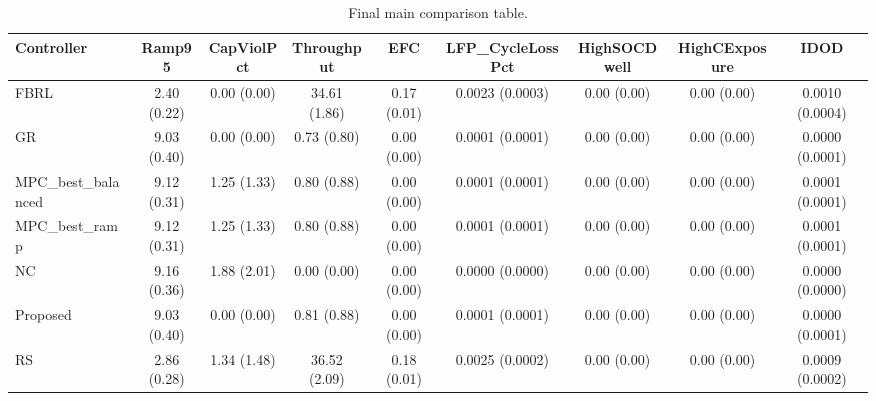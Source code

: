 \begin{table}[t]
\centering
\caption{Final main comparison table.}
\label{tab:results_final_auto}
\begin{tabular}{lcccccccc}
\toprule
Controller & Ramp95 & CapViolPct & Throughput & EFC & LFP\_CycleLossPct & HighSOCDwell & HighCExposure & IDOD \\
\midrule
FBRL & 2.40 (0.22) & 0.00 (0.00) & 34.61 (1.86) & 0.17 (0.01) & 0.0023 (0.0003) & 0.00 (0.00) & 0.00 (0.00) & 0.0010 (0.0004) \\
GR & 9.03 (0.40) & 0.00 (0.00) & 0.73 (0.80) & 0.00 (0.00) & 0.0001 (0.0001) & 0.00 (0.00) & 0.00 (0.00) & 0.0000 (0.0001) \\
MPC\_best\_balanced & 9.12 (0.31) & 1.25 (1.33) & 0.80 (0.88) & 0.00 (0.00) & 0.0001 (0.0001) & 0.00 (0.00) & 0.00 (0.00) & 0.0001 (0.0001) \\
MPC\_best\_ramp & 9.12 (0.31) & 1.25 (1.33) & 0.80 (0.88) & 0.00 (0.00) & 0.0001 (0.0001) & 0.00 (0.00) & 0.00 (0.00) & 0.0001 (0.0001) \\
NC & 9.16 (0.36) & 1.88 (2.01) & 0.00 (0.00) & 0.00 (0.00) & 0.0000 (0.0000) & 0.00 (0.00) & 0.00 (0.00) & 0.0000 (0.0000) \\
Proposed & 9.03 (0.40) & 0.00 (0.00) & 0.81 (0.88) & 0.00 (0.00) & 0.0001 (0.0001) & 0.00 (0.00) & 0.00 (0.00) & 0.0000 (0.0001) \\
RS & 2.86 (0.28) & 1.34 (1.48) & 36.52 (2.09) & 0.18 (0.01) & 0.0025 (0.0002) & 0.00 (0.00) & 0.00 (0.00) & 0.0009 (0.0002) \\
\bottomrule
\end{tabular}
\end{table}